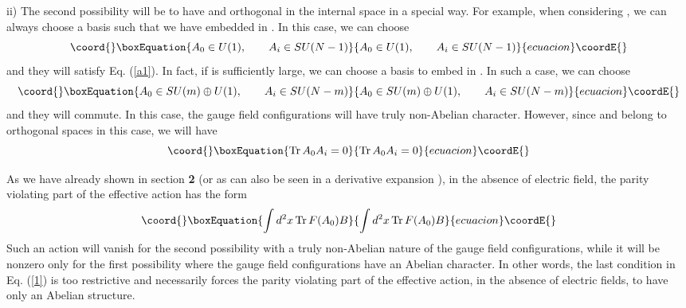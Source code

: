 \documentclass[a4paper,12pt]{article}
\begin{document}
ii) The second possibility will be to have \coordHE{} and \coordHE{}
orthogonal in the internal space in a special way. For example, when
considering \coordHE{}, we can always choose a basis such that we have
\coordHE{} embedded in \coordHE{}. In this case, we can choose
\begin{equation}\coord{}\boxEquation{
A_{0}\in U(1),\qquad A_{i}\in SU(N-1)\label{a3}
}{
A_{0}\in U(1),\qquad A_{i}\in SU(N-1)}{ecuacion}\coordE{}\end{equation}
 and they will satisfy Eq. (\ref{a1}). In fact, if \coordHE{} is sufficiently
 large, we can choose a basis to embed \coordHE{}
 in \coordHE{}. In such a case, we can choose
\begin{equation}\coord{}\boxEquation{
A_{0}\in SU(m)\oplus U(1),\qquad A_{i}\in SU(N-m)\label{a4}
}{
A_{0}\in SU(m)\oplus U(1),\qquad A_{i}\in SU(N-m)}{ecuacion}\coordE{}\end{equation}
and they will commute. In this case, the gauge field configurations
will have truly non-Abelian character. However, since \coordHE{} and
\coordHE{} belong to orthogonal spaces in this case, we will have
\begin{equation}\coord{}\boxEquation{
{\rm Tr}\, A_{0}A_{i} = 0\label{a5}
}{
{\rm Tr}\, A_{0}A_{i} = 0}{ecuacion}\coordE{}\end{equation}

As we have already shown in section {\bf 2} (or as can also be seen in a
derivative expansion \cite{Aitchison:1985pp,das:1987yb}), 
in the absence of electric field, the parity
violating part of the effective action has the form
\begin{equation}\coord{}\boxEquation{
\int d^{2}x\,{\rm Tr}\, F(A_{0}) B\label{a6}
}{
\int d^{2}x\,{\rm Tr}\, F(A_{0}) B}{ecuacion}\coordE{}\end{equation}
Such an action will vanish for the second possibility with a truly
non-Abelian nature of the gauge field configurations, while it will be
nonzero only for the first possibility where the gauge field
configurations have an Abelian character. In other words, the last
condition in Eq. (\ref{1}) is too restrictive and necessarily forces
the parity violating part of the effective action, in the absence of
electric fields, to have only an Abelian structure. 
\end{document}

